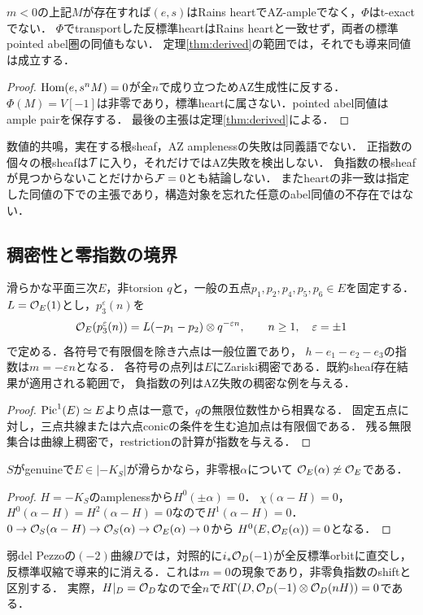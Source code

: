 \begin{corollary}\label{cor:negative}
$m<0$の上記$M$が存在すれば$(e,s)$はRains heartでAZ-ampleでなく，$\Phi$はt-exactでない．
$\Phi$でtransportした反標準heartはRains heartと一致せず，両者の標準pointed abel圏の同値もない．
定理\ref{thm:derived}の範囲では，それでも導来同値は成立する．
\end{corollary}
\begin{proof}
$\operatorname{Hom}(e,s^nM)=0$が全$n$で成り立つためAZ生成性に反する．
$\Phi(M)=V[-1]$は非零であり，標準heartに属さない．pointed abel同値はample pairを保存する．
最後の主張は定理\ref{thm:derived}による．
\end{proof}
\begin{remark}[三つの非同値な条件]
数値的共鳴，実在する根sheaf，AZ amplenessの失敗は同義語でない．
正指数の個々の根sheafは$\mathcal T$に入り，それだけではAZ失敗を検出しない．
負指数の根sheafが見つからないことだけから$\mathcal F=0$とも結論しない．
またheartの非一致は指定した同値の下での主張であり，構造対象を忘れた任意のabel同値の不存在ではない．
\end{remark}

\subsection{稠密性と零指数の境界}
\begin{proposition}\label{prop:density}
滑らかな平面三次$E$，非torsion $q$と，一般の五点$p_1,p_2,p_4,p_5,p_6\in E$を固定する．
$L=\mathcal O_E(1)$とし，$p_3^{\varepsilon}(n)$を
\[
\mathcal O_E(p_3^{\varepsilon}(n))=L(-p_1-p_2)\otimes q^{-\varepsilon n},
\qquad n\ge1,\quad\varepsilon=\pm1
\]
で定める．各符号で有限個を除き六点は一般位置であり，
$h-e_1-e_2-e_3$の指数は$m=-\varepsilon n$となる．
各符号の点列は$E$にZariski稠密である．既約sheaf存在結果が適用される範囲で，
負指数の列はAZ失敗の稠密な例を与える．
\end{proposition}
\begin{proof}
$\operatorname{Pic}^1(E)\simeq E$より点は一意で，$q$の無限位数性から相異なる．
固定五点に対し，三点共線または六点conicの条件を生む追加点は有限個である．
残る無限集合は曲線上稠密で，restrictionの計算が指数を与える．
\end{proof}
\begin{proposition}\label{prop:zeroroot}
$S$がgenuineで$E\in|-K_S|$が滑らかなら，非零根$\alpha$について
$\mathcal O_E(\alpha)\not\simeq\mathcal O_E$である．
\end{proposition}
\begin{proof}
$H=-K_S$のamplenessから$H^0(\pm\alpha)=0$．
$\chi(\alpha-H)=0$，$H^0(\alpha-H)=H^2(\alpha-H)=0$なので$H^1(\alpha-H)=0$．
$0\to\mathcal O_S(\alpha-H)\to\mathcal O_S(\alpha)\to\mathcal O_E(\alpha)\to0$から
$H^0(E,\mathcal O_E(\alpha))=0$となる．
\end{proof}
弱del Pezzoの$(-2)$曲線$D$では，対照的に$i_*\mathcal O_D(-1)$が全反標準orbitに直交し，
反標準収縮で導来的に消える．これは$m=0$の現象であり，非零負指数のshiftと区別する．
実際，$H|_D=\mathcal O_D$なので全$n$で$R\Gamma(D,\mathcal O_D(-1)\otimes\mathcal O_D(nH))=0$である．

